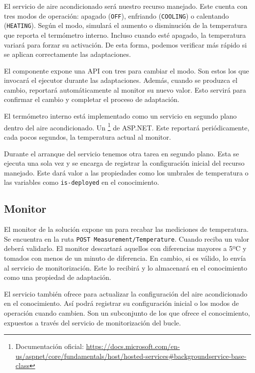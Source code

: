 El servicio de aire acondicionado será nuestro recurso manejado. Este cuenta con tres modos de operación: apagado (\texttt{OFF}), enfriando (\texttt{COOLING}) o calentando (\texttt{HEATING}). Según el modo, simulará el aumento o disminución de la temperatura que reporta el termómetro interno. Incluso cuando esté apagado, la temperatura variará para forzar su activación. De esta forma, podemos verificar más rápido si se aplican correctamente las adaptaciones.

El componente expone una API con tres  para cambiar el modo. Son estos los que invocará el ejecutor durante las adaptaciones. Además, cuando se produzca el cambio, reportará automáticamente al monitor su nuevo valor. Esto servirá para confirmar el cambio y completar el proceso de adaptación.

El termómetro interno está implementado como un servicio en segundo plano dentro del aire acondicionado. Un \footnote{Documentación oficial: \url{https://docs.microsoft.com/en-us/aspnet/core/fundamentals/host/hosted-services\#backgroundservice-base-class}} de ASP.NET. Este reportará periódicamente, cada pocos segundos, la temperatura actual al monitor.

Durante el arranque del servicio tenemos otra tarea en segundo plano. Esta se ejecuta una sola vez y se encarga de registrar la configuración inicial del recurso manejado. Este dará valor a las propiedades como los umbrales de temperatura o las variables como \texttt{is-deployed} en el conocimiento.

\subsection{Monitor}

El monitor de la solución expone un  para recabar las mediciones de temperatura. Se encuentra en la ruta \texttt{POST Measurement/Temperature}. Cuando reciba un valor deberá validarlo. El monitor descartará aquellos con diferencias mayores a 5ºC y tomados con menos de un minuto de diferencia. En cambio, si es válido, lo envía al servicio de monitorización. Este lo recibirá y lo almacenará en el conocimiento como una propiedad de adaptación.

El servicio también ofrece  para actualizar la configuración del aire acondicionado en el conocimiento. Así podrá registrar su configuración inicial o los modos de operación cuando cambien. Son un subconjunto de los que ofrece el conocimiento, expuestos a través del servicio de monitorización del bucle.

